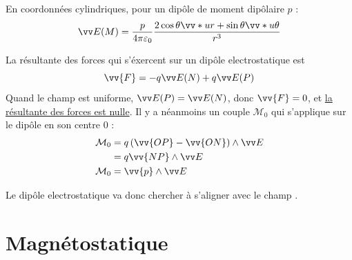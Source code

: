 \documentclass[11pt,a4paper,fleqn,pdftex]{report}
\begin{document}
\begin{theorem}
    En coordonnées cylindriques, pour un dipôle de moment dipôlaire $p$ :
   \begin{equation}
   \E(M) = \dfrac{p}{4\pi\varepsilon_0} \dfrac{2 \cos \theta \vv*{u}{r} + \sin \theta \vv*{u}{\theta}}{r^3}
   \end{equation}
\end{theorem}
\begin{theorem}
   La résultante des forces qui s'éxercent sur un dipôle electrostatique est 
   \begin{equation}
   \vv{F} = -q\E(N) + q\E(P)
   \end{equation}
   Quand le champ est uniforme, $\E(P)=\E(N)$, donc $\vv{F} = 0$, et \uline{la résultante des forces est nulle}. \newline
   Il y a néanmoins un couple $\mathcal{M}_0$ qui s'applique sur le dipôle en son centre $0$ : 
   \begin{align}
   \mathcal{M}_0  &= q \left( \vv{OP} - \vv{ON} \right) \wedge \E \notag\\
                &= q\vv{NP}\wedge \E{}\notag\\
   \mathcal{M}_0  &= \vv{p}\wedge \E
   \end{align}
\end{theorem}
Le dipôle electrostatique va donc chercher à s'aligner avec le champ \E{}.
\section{Magnétostatique}
\end{document}
